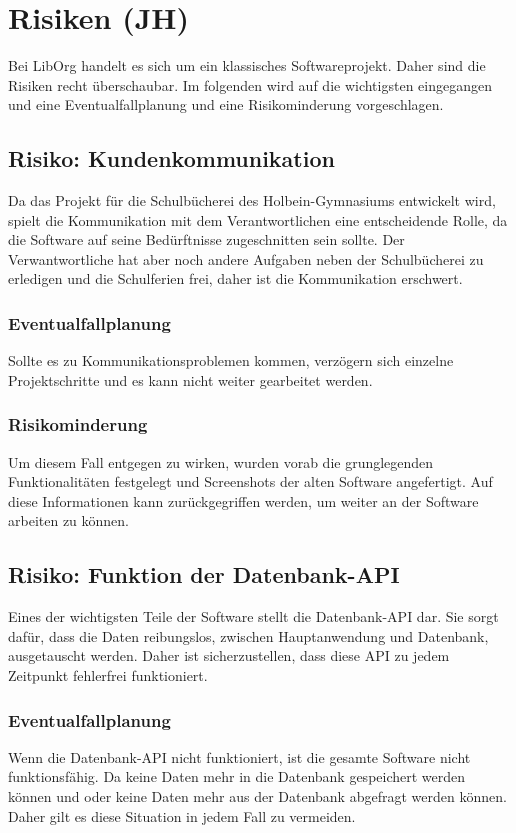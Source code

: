 \section{Risiken (JH)}
Bei LibOrg handelt es sich um ein klassisches Softwareprojekt. Daher sind die Risiken recht überschaubar. Im folgenden wird auf die wichtigsten eingegangen und eine Eventualfallplanung und eine Risikominderung vorgeschlagen.

\subsection{Risiko: Kundenkommunikation}
Da das Projekt für die Schulbücherei des Holbein-Gymnasiums entwickelt wird, spielt die Kommunikation mit dem Verantwortlichen eine entscheidende Rolle, da die Software auf seine Bedürftnisse zugeschnitten sein sollte. Der Verwantwortliche hat aber noch andere Aufgaben neben der Schulbücherei zu erledigen und die Schulferien frei, daher ist die Kommunikation erschwert.
\subsubsection{Eventualfallplanung}
Sollte es zu Kommunikationsproblemen kommen, verzögern sich einzelne Projektschritte und es kann nicht weiter gearbeitet werden.
\subsubsection{Risikominderung}
Um diesem Fall entgegen zu wirken, wurden vorab die grunglegenden Funktionalitäten festgelegt und Screenshots der alten Software angefertigt. Auf diese Informationen kann zurückgegriffen werden, um weiter an der Software arbeiten zu können.

\subsection{Risiko: Funktion der Datenbank-API}
Eines der wichtigsten Teile der Software stellt die Datenbank-API dar. Sie sorgt dafür, dass die Daten reibungslos, zwischen Hauptanwendung und Datenbank, ausgetauscht werden. Daher ist sicherzustellen, dass diese API zu jedem Zeitpunkt fehlerfrei funktioniert. 
\subsubsection{Eventualfallplanung}
Wenn die Datenbank-API nicht funktioniert, ist die gesamte Software nicht funktionsfähig. Da keine Daten mehr in die Datenbank gespeichert werden können und \/ oder keine Daten mehr aus der Datenbank abgefragt werden können. Daher gilt es diese Situation in jedem Fall zu vermeiden.
